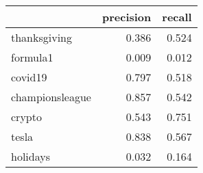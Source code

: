 \begin{tabular}{lrr}
\toprule
{} &  precision &  recall \\
\midrule
thanksgiving    &      0.386 &   0.524 \\
formula1        &      0.009 &   0.012 \\
covid19         &      0.797 &   0.518 \\
championsleague &      0.857 &   0.542 \\
crypto          &      0.543 &   0.751 \\
tesla           &      0.838 &   0.567 \\
holidays        &      0.032 &   0.164 \\
\bottomrule
\end{tabular}
